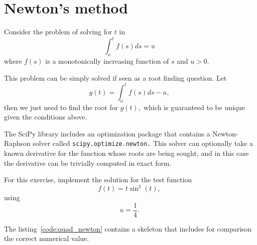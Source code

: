 \section{Newton's method}
\label{sec:quad_newton}

Consider the problem of solving for $t$ in
\begin{equation}
  \int_{o}^{t}f(s)ds=u
\end{equation} 
where $f(s)$ is a monotonically increasing function of $s$ and $u>0$.

This problem can be simply solved if seen as a root finding question. Let
\begin{equation}
g(t)=\int_{o}^{t}f(s)ds-u,
\end{equation}
then we just need to find the root for $g(t),$ which is guaranteed
to be unique given the conditions above. 

The SciPy library includes an optimization package that contains a
Newton-Raphson solver called \texttt{scipy.optimize.newton.} This
solver can optionally take a known derivative for the function whose
roots are being sought, and in this case the derivative can be trivially
computed in exact form.

For this exercise, implement the solution for the test function 
\[
f(t)=t\sin^{2}(t), 
\]
using 
\[ 
u=\frac{1}{4}. 
\]

The listing~\ref{code:quad_newton} contains a skeleton that
includes for comparison the correct numerical value.


